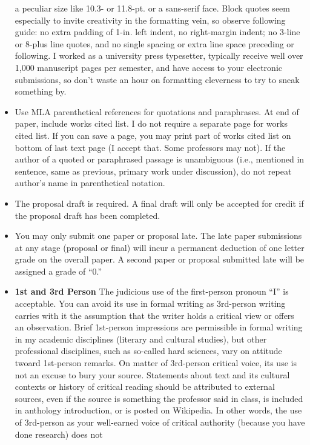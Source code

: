 \documentclass[]{article}
\begin{document}
\begin{itemize}
  a peculiar size like 10.3- or 11.8-pt. or a sans-serif face. Block
  quotes seem especially to invite creativity in the formatting vein, so
  observe following guide: no extra padding of 1-in. left indent, no
  right-margin indent; no 3-line or 8-plus line quotes, and no single
  spacing or extra line space preceding or following. I worked as a
  university press typesetter, typically receive well over 1,000
  manuscript pages per semester, and have access to your electronic
  submissions, so don't waste an hour on formatting cleverness to try to
  sneak something by.
\item
  Use MLA parenthetical references for quotations and paraphrases. At
  end of paper, include works cited list. I do not require a separate
  page for works cited list. If you can save a page, you may print part
  of works cited list on bottom of last text page (I accept that. Some
  professors may not). If the author of a quoted or paraphrased passage
  is unambiguous (i.e., mentioned in sentence, same as previous, primary
  work under discussion), do not repeat author's name in parenthetical
  notation.
\item
  The proposal draft is required. A final draft will only be accepted
  for credit if the proposal draft has been completed.
\item
  You may only submit one paper or proposal late. The late paper
  submissions at any stage (proposal or final) will incur a permanent
  deduction of one letter grade on the overall paper. A second paper or
  proposal submitted late will be assigned a grade of ``0.''
\item
  \textbf{1st and 3rd Person} The judicious use of the first-person
  pronoun ``I'' is acceptable. You can avoid its use in formal writing
  as 3rd-person writing carries with it the assumption that the writer
  holds a critical view or offers an observation. Brief 1st-person
  impressions are permissible in formal writing in my academic
  disciplines (literary and cultural studies), but other professional
  disciplines, such as so-called hard sciences, vary on attitude twoard
  1st-person remarks. On matter of 3rd-person critical voice, its use is
  not an excuse to bury your source. Statements about text and its
  cultural contexts or history of critical reading should be attributed
  to external sources, even if the source is something the professor
  said in class, is included in anthology introduction, or is posted on
  Wikipedia. In other words, the use of 3rd-person as your well-earned
  voice of critical authority (because you have done research) does not

\end{itemize}
\end{document}
